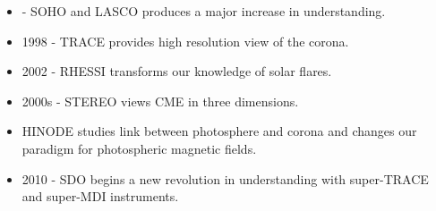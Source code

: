 \documentclass{../template/texnote}
\begin{document}
\begin{itemize}
	\item           - SOHO and LASCO produces a major increase in understanding.
	\item 1998 - TRACE provides high resolution view of the corona.
	\item 2002 - RHESSI transforms our knowledge of solar flares.
	\item 2000s - STEREO views CME in three dimensions.
	\item  HINODE studies link between photosphere and corona and changes our paradigm for photospheric magnetic fields.
	\item 2010 - SDO begins a new revolution in understanding with super-TRACE and super-MDI instruments.
\end{itemize}


    \printbibliography
\end{document}
